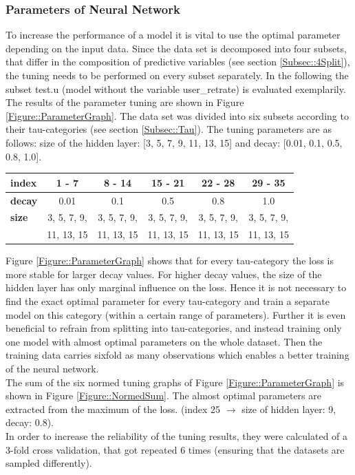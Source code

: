 \documentclass[a4paper,12pt]{article}
\begin{document}
\subsubsection{Parameters of Neural Network}\label{Subsec::ParsNNet}
To increase the performance of a model it is vital to use the optimal parameter depending on the input data. Since the data set is decomposed into four subsets, that differ in the composition of predictive variables (see section \ref{Subsec::4Split}), the tuning needs to be performed on every subset separately. In the following the subset test.u (model without the variable user\_retrate) is evaluated exemplarily.\\
The results of the parameter tuning are shown in Figure \ref{Figure::ParameterGraph}. The data set was divided into six subsets according to their tau-categories (see section \ref{Subsec::Tau}). The tuning parameters are as follows: size of the hidden layer: [3, 5, 7, 9, 11, 13, 15] and decay: [0.01, 0.1, 0.5, 0.8, 1.0].\\
\begin{center}
\begin{tabular}{| l || c | c | c | c | c |}
 \hline
 \textbf{index}  & 1 - 7 & 8 - 14 & 15 - 21 & 22 - 28 & 29 - 35\\
 \hline
  \textbf{decay} & 0.01   & 0.1     & 0.5     & 0.8   & 1.0 \\
  \hline
 \textbf{size}   & 3, 5, 7, 9, & 3, 5, 7, 9, & 3, 5, 7, 9, & 3, 5, 7, 9, & 3, 5, 7, 9,\\ 
                 & 11, 13, 15  & 11, 13, 15  & 11, 13, 15  & 11, 13, 15  & 11, 13, 15 \\
\hline 
\end{tabular} 
\end{center} 
\vspace{0.8cm}

Figure \ref{Figure::ParameterGraph} shows that for every tau-category the loss is more stable for larger decay values. For higher decay values, the size of the hidden layer has only marginal influence on the loss. Hence it is not necessary to find the exact optimal parameter for every tau-category and train a separate model on this category (within a certain range of parameters). Further it is even beneficial to refrain from splitting into tau-categories, and instead training only one model with almost optimal parameters on the whole dataset. Then the training data carries sixfold as many observations which enables a better training of the neural network.\\
The sum of the six normed tuning graphs of Figure \ref{Figure::ParameterGraph} is shown in Figure \ref{Figure::NormedSum}. The almost optimal parameters are extracted from the maximum of the loss. (index 25 $\rightarrow$ size of hidden layer: 9, decay: 0.8).\\
In order to increase the reliability of the tuning results, they were calculated of a 3-fold cross validation, that got repeated 6 times (ensuring that the datasets are sampled differently). 
\end{document}
